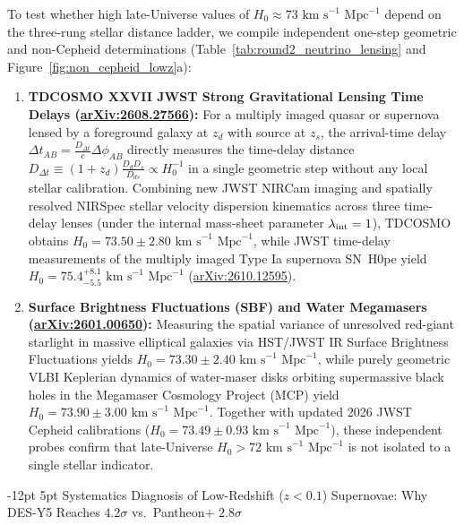 \documentclass[11pt,letterpaper]{article}
\makeatletter
\renewcommand{\subsection}{\@startsection{subsection}{2}{\z@}%
  {-12pt \@plus -3pt \@minus -1pt}%
  {5pt \@plus 1pt}%
  {\normalfont\large\bfseries\color{tealaccent}}}
\makeatother
\begin{document}
To test whether high late-Universe values of $H_0 \approx 73\text{ km s}^{-1}\text{ Mpc}^{-1}$ depend on the three-rung stellar distance ladder, we compile independent one-step geometric and non-Cepheid determinations (Table~\ref{tab:round2_neutrino_lensing} and Figure~\ref{fig:non_cepheid_lowz}a):
\begin{enumerate}
    \setlength{\itemsep}{3pt}
    \item \textbf{TDCOSMO XXVII JWST Strong Gravitational Lensing Time Delays (\href{https://arxiv.org/abs/2608.27566}{arXiv:2608.27566}):} For a multiply imaged quasar or supernova lensed by a foreground galaxy at $z_d$ with source at $z_s$, the arrival-time delay $\Delta t_{AB} = \frac{D_{\Delta t}}{c} \Delta\phi_{AB}$ directly measures the time-delay distance $D_{\Delta t} \equiv (1+z_d)\frac{D_d D_s}{D_{ds}} \propto H_0^{-1}$ in a single geometric step without any local stellar calibration. Combining new JWST NIRCam imaging and spatially resolved NIRSpec stellar velocity dispersion kinematics across three time-delay lenses (under the internal mass-sheet parameter $\lambda_{\rm int} = 1$), TDCOSMO obtains $H_0 = 73.50 \pm 2.80\text{ km s}^{-1}\text{ Mpc}^{-1}$, while JWST time-delay measurements of the multiply imaged Type Ia supernova SN~H0pe yield $H_0 = 75.4^{+8.1}_{-5.5}\text{ km s}^{-1}\text{ Mpc}^{-1}$ (\href{https://arxiv.org/html/2610.12595v1}{arXiv:2610.12595}).
    \item \textbf{Surface Brightness Fluctuations (SBF) and Water Megamasers (\href{https://arxiv.org/pdf/2601.00650}{arXiv:2601.00650}):} Measuring the spatial variance of unresolved red-giant starlight in massive elliptical galaxies via HST/JWST IR Surface Brightness Fluctuations yields $H_0 = 73.30 \pm 2.40\text{ km s}^{-1}\text{ Mpc}^{-1}$, while purely geometric VLBI Keplerian dynamics of water-maser disks orbiting supermassive black holes in the Megamaser Cosmology Project (MCP) yield $H_0 = 73.90 \pm 3.00\text{ km s}^{-1}\text{ Mpc}^{-1}$. Together with updated 2026 JWST Cepheid calibrations ($H_0 = 73.49 \pm 0.93\text{ km s}^{-1}\text{ Mpc}^{-1}$), these independent probes confirm that late-Universe $H_0 > 72\text{ km s}^{-1}\text{ Mpc}^{-1}$ is not isolated to a single stellar indicator.
\end{enumerate}

\subsection{Systematics Diagnosis of Low-Redshift ($z < 0.1$) Supernovae: Why DES-Y5 Reaches $4.2\sigma$ vs.\ Pantheon+ $2.8\sigma$}
\end{document}
